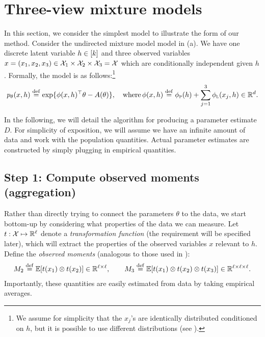 \section{Three-view mixture models}
\label{sec:threeViewMixtureModel}


In this section, we consider the simplest model to illustrate the form of our method.
Consider the undirected mixture model model in (a).
We have one discrete latent variable $h \in [k]$ and
three observed variables
$x = (x_1, x_2, x_3) \in \mathcal{X}_1 \times \mathcal{X}_2 \times \mathcal{X}_3 = \mathcal{X}$
which are conditionally independent given $h$.
Formally, the model is as follows:\footnote{We assume for simplicity that the $x_j$'s are identically distributed conditioned on $h$,
but it is possible to use different distributions (see \citet{anandkumar12moments}).}
\begin{align}
  \label{eqn:mixtureModel}
  p_\theta(x, h) \stackrel{\rm def}{=} \exp \{ \phi(x, h)^\top\theta - A(\theta) \}, \quad\text{where} \, \phi(x, h) \stackrel{\rm def}{=} \phi_\text{\sc p}(h) + \sum_{j=1}^3 \phi_\text{\sc l}(x_j, h) \in \mathbb{R}^d.
\end{align}

In the following, we will detail the algorithm for producing a parameter
estimate $D$.  For simplicity of exposition, we will assume we have an infinite
amount of data and work with the population quantities.  Actual parameter
estimates are constructed by simply plugging in empirical quantities.

\subsection{Step 1: Compute observed moments (aggregation)}

Rather than directly trying to connect the parameters $\theta$ to the data, we start
bottom-up by considering what properties of the data we can measure.
Let $t : \mathcal{X} \mapsto \mathbb{R}^\ell$ denote a \emph{transformation function} (the requirement will be specified later),
which will extract the properties of the observed variables $x$ relevant to $h$.
Define the \emph{observed moments} (analogous to those used in \cite{anandkumar12moments}):
\begin{align}
  M_2 \stackrel{\rm def}{=} \mathbb{E}[t(x_1) \otimes t(x_2)] \in \mathbb{R}^{\ell \times \ell}, \quad\quad
  M_3 \stackrel{\rm def}{=} \mathbb{E}[t(x_1) \otimes t(x_2) \otimes t(x_3)] \in \mathbb{R}^{\ell \times \ell \times \ell}.
\end{align}
Importantly, these quantities are easily estimated from data by taking empirical averages.

